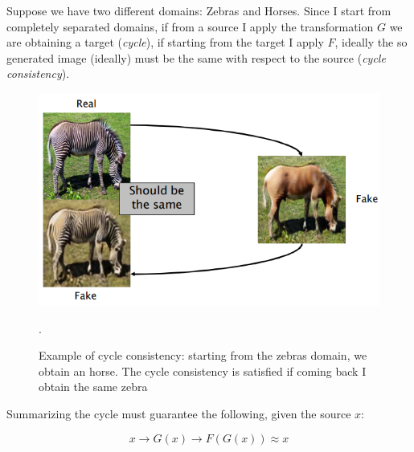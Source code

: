 Suppose we have two different domains: Zebras and Horses. Since I start from completely separated domains, if from a source I apply the transformation $G$ we are obtaining a target (\textit{cycle}), if starting from the target I apply $F$, ideally the so generated image (ideally) must be the same with respect to the source (\textit{cycle consistency}).

\begin{figure}[h]
    \centering
    \includegraphics[scale=0.7]{img/cyclecons.png}
    \caption{Example of cycle consistency: starting from the zebras domain, we obtain an horse. The cycle consistency is satisfied if coming back I obtain the same zebra}.
\end{figure}

\noindent
Summarizing the cycle must guarantee the following, given the source $x$: 

\begin{equation*}
    x \to G(x) \to F(G(x)) \approx x 
\end{equation*}

